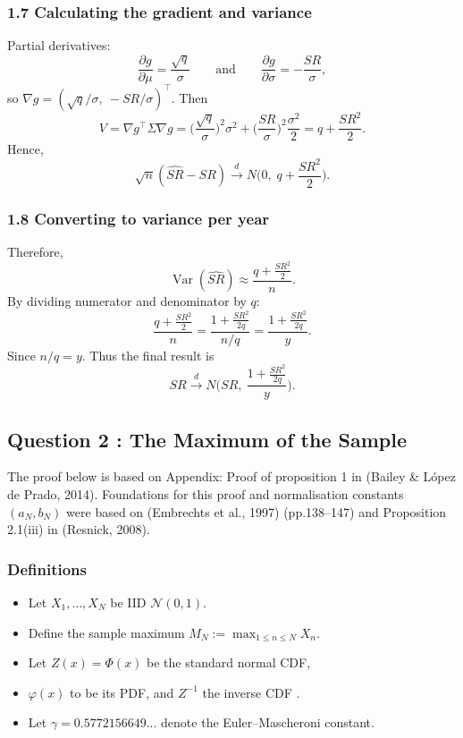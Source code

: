 \documentclass[
  12pt,
]{article}
\begin{document}
\subsubsection{1.7 Calculating the gradient and
variance}\label{calculating-the-gradient-and-variance}

Partial derivatives: \[
\frac{\partial g}{\partial\mu}=\frac{\sqrt{q}}{\sigma} \qquad \text{and} \qquad
\frac{\partial g}{\partial\sigma}=-\frac{SR}{\sigma},
\] so \(\nabla g=(\sqrt{q}/\sigma,\ -SR/\sigma)^\top\). Then \[
V=\nabla g^\top\Sigma\nabla g
= \Big(\frac{\sqrt{q}}{\sigma}\Big)^2\sigma^2 + \Big(\frac{SR}{\sigma}\Big)^2\frac{\sigma^2}{2}
= q + \frac{SR^2}{2} \tag{15}.
\] Hence, \[
\sqrt{n}(\widehat{SR}-SR)\xrightarrow{d} N\!\Big(0,\; q+\frac{SR^2}{2}\Big).
\]

\subsubsection{1.8 Converting to variance per
year}\label{converting-to-variance-per-year}

Therefore,\[
\operatorname{Var}(\widehat{SR})\approx\frac{q+\tfrac{SR^2}{2}}{n} \tag{16}.
\] By dividing numerator and denominator by \(q\): \[
\frac{q+\tfrac{SR^2}{2}}{n}=\frac{1+\tfrac{SR^2}{2q}}{\,n/q\,}= \frac{1+\tfrac{SR^2}{2q}}{y} \tag{17}.
\] Since \(n/q=y\). Thus the final result is \[
\widehat{SR}\xrightarrow{d} N\!\Big(SR,\ \frac{1+\tfrac{SR^2}{2q}}{y}\Big) \tag{18}.
\]

\newpage

\subsection{Question 2 : The Maximum of the
Sample}\label{question-2-the-maximum-of-the-sample}

The proof below is based on Appendix: Proof of proposition 1 in (Bailey
\& López de Prado, 2014). Foundations for this proof and normalisation
constants \((a_N,b_N)\) were based on (Embrechts et al., 1997)
(pp.138--147) and Proposition 2.1(iii) in (Resnick, 2008).

\subsubsection{Definitions}\label{definitions}

\begin{itemize}
\item
  Let \(X_1,\dots,X_N\) be IID \(\mathcal{N}(0,1)\).
\item
  Define the sample maximum \(M_N := \max_{1\le n\le N} X_n.\)
\item
  Let \(Z(x)=\Phi(x)\) be the standard normal CDF,
\item
  \(\varphi(x)\) to be its PDF, and \(Z^{-1}\) the inverse CDF .
\item
  Let \(\gamma= 0.5772156649...\) denote the Euler--Mascheroni constant.
\end{itemize}
\end{document}
